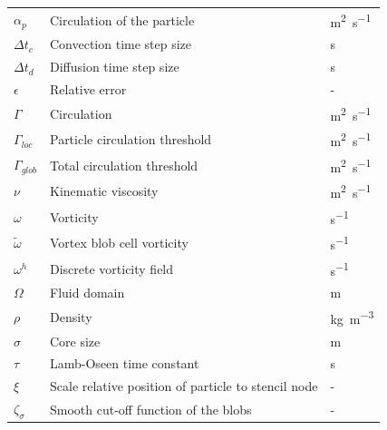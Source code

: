 {\renewcommand{\arraystretch}{1.2} %
\begin{longtable}{p{1.5cm}p{10.5cm}p{1.5cm}}
	$\alpha_p$ 		& Circulation of the particle & \si{m^2.s^{-1}}\\

	$\Delta t_c$ 		& Convection time step size & \si{s}\\
	$\Delta t_d$ 		& Diffusion time step size & \si{s}\\	

	$\epsilon$ 		& Relative error & -\\		

	$\Gamma$ 		& Circulation & \si{m^2.s^{-1}}\\	
	$\Gamma_{loc}$ 		& Particle circulation threshold & \si{m^2.s^{-1}}\\	
	$\Gamma_{glob}$ 		& Total circulation threshold & \si{m^2.s^{-1}}\\		

	$\nu$ & Kinematic viscosity & \si{m^2.s^{-1}}\\

	$\omega$ & Vorticity & \si{s^{-1}}\\
	$\tilde{\omega}$ & Vortex blob cell vorticity & \si{s^{-1}}\\
	$\omega^h$ & Discrete vorticity field & \si{s^{-1}}\\

	$\Omega$ & Fluid domain & \si{m}\\

	$\rho$ & Density & \si{kg.m^{-3}}\\
	
	$\sigma$ & Core size & \si{m}\\
	$\tau$ & Lamb-Oseen time constant & \si{s}\\
	$\xi$ & Scale relative position of particle to stencil node & -\\
	$\zeta_{\sigma}$		& Smooth cut-off function of the blobs & -\\			

\end{longtable}}

